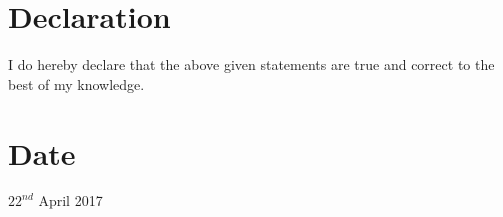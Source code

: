 \documentclass{article}
\newcommand\tab[1][1cm]{\hspace*{#1}}
\begin{document}
	\section*{Declaration}
		\tab I do hereby declare that the above given statements are true and correct to the best of my knowledge.	
		
	 \section*{Date} 
		\tab $22^{nd}$ April 2017	
	
\end{document}
